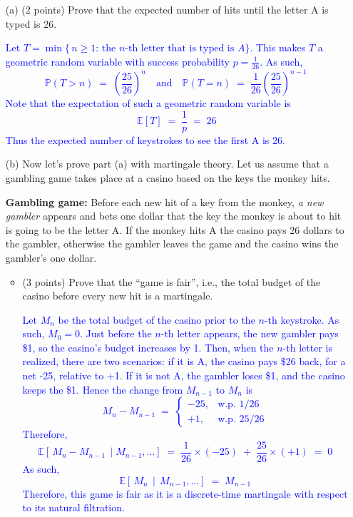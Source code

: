 \documentclass{article}
\begin{document}
\begin{enumerate}
    \item[(a)] (2 points) Prove that the expected number of hits until the letter A is typed is 26.

        \textcolor{blue}{
            Let $T = \min\{\,n \ge 1:\, \text{the }n\text{-th letter that is typed is }A\}$. This makes $T$ a geometric random variable with success probability $p=\tfrac{1}{26}$. As such,
\[
\mathbb{P}(T > n) \;=\; \left(\frac{25}{26}\right)^n
\quad \text{and} \quad
\mathbb{P}(T=n) \;=\; \frac{1}{26}
\left(\frac{25}{26}\right)^{n-1}\,\]
Note that the expectation of such a geometric random variable is
\[
\mathbb{E}[T] \;=\; \frac{1}{p} 
\;=\; 26
\]
Thus the expected number of keystrokes to see the first A is 26.
        }
    
    \item[(b)] Now let’s prove part (a) with martingale theory. Let us assume that a gambling game takes place at a casino based on the keys the monkey hits.
    
    \textbf{Gambling game:} Before each new hit of a key from the monkey, \textit{a new gambler} appears and bets one dollar that the key the monkey is about to hit is going to be the letter A. If the monkey hits A the casino pays 26 dollars to the gambler, otherwise the gambler leaves the game and the casino wins the gambler’s one dollar.
    \begin{itemize}
        \item (3 points) Prove that the ``game is fair'', i.e., the total budget of the casino before every new hit is a martingale.

    \textcolor{blue}{
        Let $M_n$ be the total budget of the casino prior to the $n$-th keystroke. As such, $M_0=0$. Just before the $n$-th letter appears,
        the new gambler pays \$1, so the casino's budget increases by 1.
Then, when the $n$-th letter is realized, there are two scenarios:
if it is A, the casino pays \$26 back, for a net  -25, relative to +1.
If it is not A, the gambler loses \$1, and the casino keeps the \$1.
Hence the change from $M_{n-1}$ to $M_n$ is
\[
M_n - M_{n-1} \;=\;
\begin{cases}
-25, & \text{w.p. } 1/26\\
+1, & \text{w.p. } 25/26
\end{cases}
\]
Therefore,
\[
\mathbb{E}[\,M_n - M_{n-1}\,\mid M_{n-1},\dots]
\;=\;
\frac{1}{26}\times(-25) \;+\; \frac{25}{26}\times (+1)
\;=\; 0
\]
As such,
\[
\mathbb{E}[\,M_n \,\mid\, M_{n-1},\ldots]\;=\;M_{n-1}
\]
Therefore, this game is fair as it is a discrete-time martingale with respect to its natural filtration.
    }


\end{itemize}
\end{enumerate}
\end{document}
